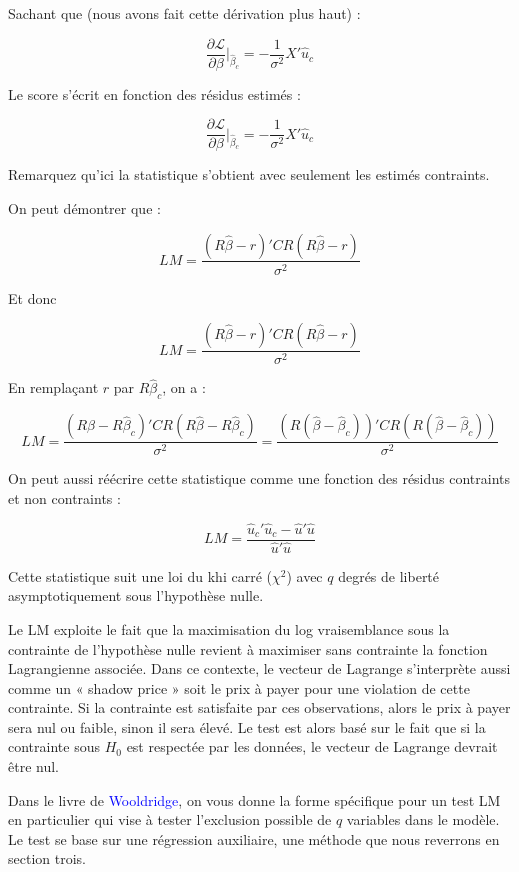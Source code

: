 \documentclass[14pt]{extarticle} %
\theoremstyle{definition}
\theoremstyle{plain}
\newcommand{\livre}[1]{\textcolor{blue}{#1}}
\begin{document}
Sachant que (nous avons fait cette dérivation plus haut) :

\[
\frac{\partial \mathcal{L}}{\partial \beta}\bigg|_{\hat{\beta}_c} = -\frac{1}{\sigma^2} X'\hat{u}_c
\]

Le score s’écrit en fonction des résidus estimés :

\[
\frac{\partial \mathcal{L}}{\partial \beta}\bigg|_{\hat{\beta}_c} = -\frac{1}{\sigma^2} X'\hat{u}_c
\]

Remarquez qu’ici la statistique s’obtient avec seulement les estimés contraints.

On peut démontrer que :

\[
LM = \frac{(R\hat{\beta} - r)'CR(R\hat{\beta} - r)}{\sigma^2}
\]

Et donc

\[
LM = \frac{(R\hat{\beta} - r)'CR(R\hat{\beta} - r)}{\sigma^2}
\]

En remplaçant $r$ par $R\hat{\beta}_c$, on a :

\[
LM = \frac{(R\hat{\beta} - R\hat{\beta}_c)'CR(R\hat{\beta} - R\hat{\beta}_c)}{\sigma^2} = \frac{(R(\hat{\beta} - \hat{\beta}_c))'CR(R(\hat{\beta} - \hat{\beta}_c))}{\sigma^2}
\]

On peut aussi réécrire cette statistique comme une fonction des résidus contraints et non contraints :

\[
LM = \frac{\hat{u}_c'\hat{u}_c - \hat{u}'\hat{u}}{\hat{u}'\hat{u}}
\]

Cette statistique suit une loi du khi carré ($\chi^2$) avec $q$ degrés de liberté asymptotiquement sous l’hypothèse nulle.

Le LM exploite le fait que la maximisation du log vraisemblance sous la contrainte de l’hypothèse nulle revient à maximiser sans contrainte la fonction Lagrangienne associée. Dans ce contexte, le vecteur de Lagrange s’interprète aussi comme un « shadow price » soit le prix à payer pour une violation de cette contrainte. Si la contrainte est satisfaite par ces observations, alors le prix à payer sera nul ou faible, sinon il sera élevé. Le test est alors basé sur le fait que si la contrainte sous $H_0$ est respectée par les données, le vecteur de Lagrange devrait être nul.

Dans le livre de \livre{Wooldridge}, on vous donne la forme spécifique pour un test LM en particulier qui vise à tester l’exclusion possible de $q$ variables dans le modèle. Le test se base sur une régression auxiliaire, une méthode que nous reverrons en section trois.
\end{document}

